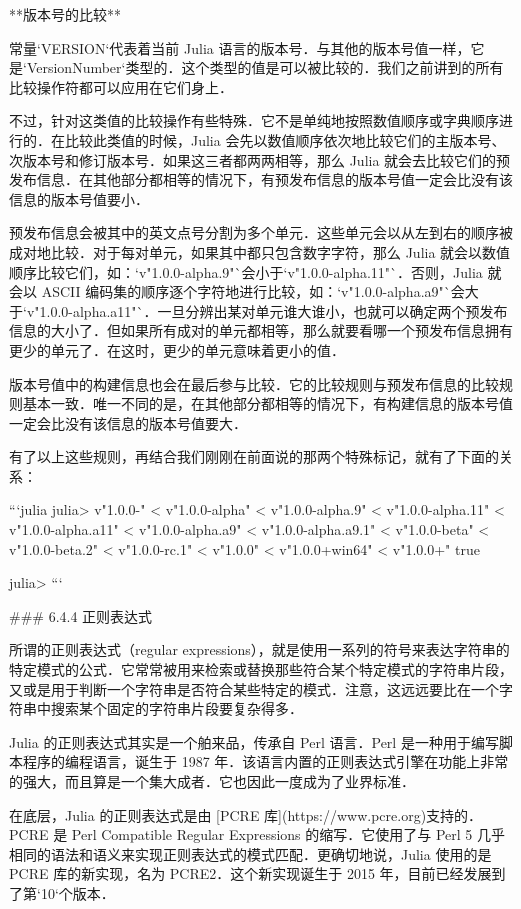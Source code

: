 **版本号的比较**

常量`VERSION`代表着当前 Julia 语言的版本号．与其他的版本号值一样，它是`VersionNumber`类型的．这个类型的值是可以被比较的．我们之前讲到的所有比较操作符都可以应用在它们身上．

不过，针对这类值的比较操作有些特殊．它不是单纯地按照数值顺序或字典顺序进行的．在比较此类值的时候，Julia 会先以数值顺序依次地比较它们的主版本号、次版本号和修订版本号．如果这三者都两两相等，那么 Julia 就会去比较它们的预发布信息．在其他部分都相等的情况下，有预发布信息的版本号值一定会比没有该信息的版本号值要小．

预发布信息会被其中的英文点号分割为多个单元．这些单元会以从左到右的顺序被成对地比较．对于每对单元，如果其中都只包含数字字符，那么 Julia 就会以数值顺序比较它们，如：`v"1.0.0-alpha.9"`会小于`v"1.0.0-alpha.11"`．否则，Julia 就会以 ASCII 编码集的顺序逐个字符地进行比较，如：`v"1.0.0-alpha.a9"`会大于`v"1.0.0-alpha.a11"`．一旦分辨出某对单元谁大谁小，也就可以确定两个预发布信息的大小了．但如果所有成对的单元都相等，那么就要看哪一个预发布信息拥有更少的单元了．在这时，更少的单元意味着更小的值．

版本号值中的构建信息也会在最后参与比较．它的比较规则与预发布信息的比较规则基本一致．唯一不同的是，在其他部分都相等的情况下，有构建信息的版本号值一定会比没有该信息的版本号值要大．

有了以上这些规则，再结合我们刚刚在前面说的那两个特殊标记，就有了下面的关系：

```julia
julia> v"1.0.0-" < v"1.0.0-alpha" < v"1.0.0-alpha.9" < v"1.0.0-alpha.11" < v"1.0.0-alpha.a11" < v"1.0.0-alpha.a9" < v"1.0.0-alpha.a9.1" < v"1.0.0-beta" < v"1.0.0-beta.2" < v"1.0.0-rc.1" < v"1.0.0" < v"1.0.0+win64" < v"1.0.0+"
true

julia> 
```

### 6.4.4 正则表达式

所谓的正则表达式（regular expressions），就是使用一系列的符号来表达字符串的特定模式的公式．它常常被用来检索或替换那些符合某个特定模式的字符串片段，又或是用于判断一个字符串是否符合某些特定的模式．注意，这远远要比在一个字符串中搜索某个固定的字符串片段要复杂得多．

Julia 的正则表达式其实是一个舶来品，传承自 Perl 语言．Perl 是一种用于编写脚本程序的编程语言，诞生于 1987 年．该语言内置的正则表达式引擎在功能上非常的强大，而且算是一个集大成者．它也因此一度成为了业界标准．

在底层，Julia 的正则表达式是由 [PCRE 库](https://www.pcre.org)支持的．PCRE 是 Perl Compatible Regular Expressions 的缩写．它使用了与 Perl 5 几乎相同的语法和语义来实现正则表达式的模式匹配．更确切地说，Julia 使用的是 PCRE 库的新实现，名为 PCRE2．这个新实现诞生于 2015 年，目前已经发展到了第`10`个版本．

